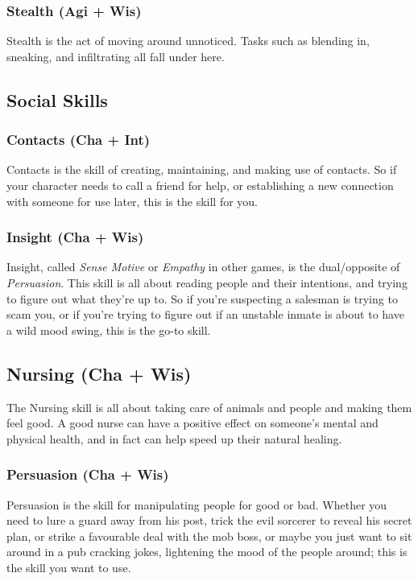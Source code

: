 \subsubsection{Stealth (Agi + Wis)}
Stealth is the act of moving around unnoticed.
Tasks such as blending in, sneaking, and infiltrating all fall under here.

\subsection{Social Skills}
\subsubsection{Contacts (Cha + Int)}
Contacts is the skill of creating, maintaining, and making use of contacts.
So if your character needs to call a friend for help, or establishing a new connection with someone for use later, this is the skill for you.

\subsubsection{Insight (Cha + Wis)}
Insight, called \textit{Sense Motive} or \textit{Empathy} in other games, is the dual/opposite of \textit{Persuasion}. 
This skill is all about reading people and their intentions, and trying to figure out what they're up to.
So if you're suspecting a salesman is trying to scam you, or if you're trying to figure out if an unstable inmate is about to have a wild mood swing, this is the go-to skill.

\subsection{Nursing (Cha + Wis)}
The Nursing skill is all about taking care of animals and people and making them feel good.
A good nurse can have a positive effect on someone's mental and physical health, and in fact can help speed up their natural healing.

\subsubsection{Persuasion (Cha + Wis)}
Persuasion is the skill for manipulating people for good or bad.
Whether you need to lure a guard away from his post, trick the evil sorcerer to reveal his secret plan, or strike a favourable deal with the mob boss, or maybe you just want to sit around in a pub cracking jokes, lightening the mood of the people around; this is the skill you want to use.

